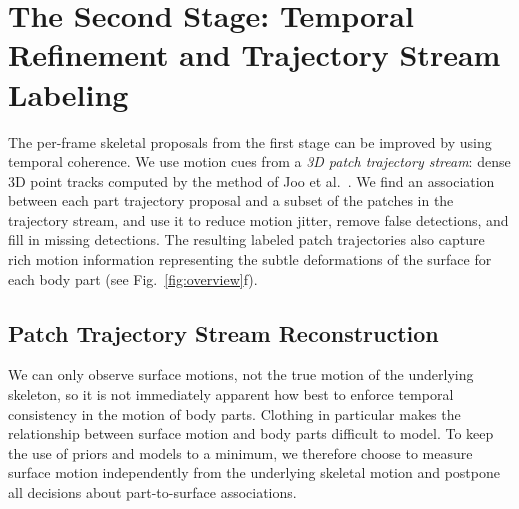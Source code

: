\section{The Second Stage: Temporal Refinement and Trajectory Stream Labeling}
The per-frame skeletal proposals from the first stage can be improved by using temporal coherence. We use motion cues from a {\em 3D patch trajectory stream}: dense 3D point tracks computed by the method of Joo et al.~\cite{Joo2014}. We find an association between each part trajectory proposal and a subset of the patches in the trajectory stream, and use it to reduce motion jitter, remove false detections, and fill in missing detections. The resulting labeled patch trajectories also capture rich motion information representing the subtle deformations of the surface for each body part (see Fig.~\ref{fig:overview}f).

%	
%
%
%
%	

\subsection{Patch Trajectory Stream Reconstruction}
\label{subsection:patchTrajectoryRecon}
We can only observe surface motions, not the true motion of the underlying skeleton, so it is not immediately apparent how best to enforce temporal consistency in the motion of body parts. Clothing in particular makes the relationship between surface motion and body parts difficult to model. To keep the use of priors and models to a minimum, we therefore choose to measure surface motion independently from the underlying skeletal motion and postpone all decisions about part-to-surface associations.

